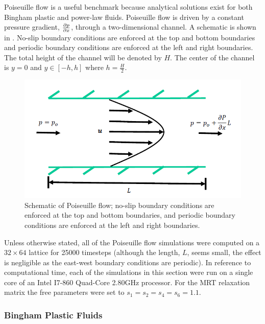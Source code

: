 \documentclass[pdftex,ms]{pittetd}
\begin{document}
Poiseuille flow is a useful benchmark because analytical solutions exist for both Bingham plastic and power-law fluids.
Poiseuille flow is driven by a constant pressure gradient, $\frac{\partial p}{\partial x}$, through a two-dimensional channel.
A schematic is shown in .
No-slip boundary conditions are enforced at the top and bottom boundaries and periodic boundary conditions are enforced at the left and right boundaries.
The total height of the channel will be denoted by $H$.
The center of the channel is $y = 0$ and $y \in [-h, h]$ where $h = \frac{H}{2}$.

\begin{figure}
	\centering
    \includegraphics[width=\linewidth]{figs/poise-schematic}
    \caption{Schematic of Poiseuille flow; no-slip boundary conditions are enforced at the top and bottom boundaries, and periodic boundary conditions are enforced at the left and right boundaries.}
    \label{fig:poise-schematic}
\end{figure}

Unless otherwise stated, all of the Poiseuille flow simulations were computed on a $32 \times 64$ lattice for 25000 timesteps (although the length, $L$, seems small, the effect is negligible as the east-west boundary conditions are periodic).
In reference to computational time, each of the simulations in this section were run on a single core of an Intel I7-860 Quad-Core 2.80GHz processor.
For the MRT relaxation matrix the free parameters were set to $s_1 = s_2 = s_4 = s_6 = 1.1$.

\subsubsection{Bingham Plastic Fluids} \label{sec:poise-bing}
\end{document}
